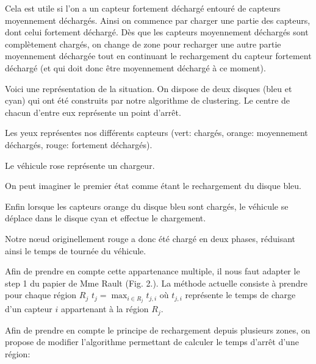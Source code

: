 \documentclass[final]{polytech/polytech}
\begin{document}
			Cela est utile si l'on a un capteur fortement déchargé entouré de capteurs moyennement déchargés.
			Ainsi on commence par charger une partie des capteurs, dont celui fortement déchargé.
			Dès que les capteurs moyennement déchargés sont complètement chargés, on change de zone pour recharger une autre partie moyennement déchargée tout en continuant le rechargement du capteur fortement déchargé (et qui doit donc être moyennement déchargé à ce moment).
			
			Voici une représentation de la situation.
			On dispose de deux disques (bleu et cyan) qui ont été construits par notre algorithme de clustering.
			Le centre de chacun d'entre eux représente un point d'arrêt.
			
			Les yeux représentes nos différents capteurs (vert: chargés, orange: moyennement déchargés, rouge: fortement déchargés).
			
			Le véhicule rose représente un chargeur.
			
			On peut imaginer le premier état comme étant le rechargement du disque bleu.
			
			
			Enfin lorsque les capteurs orange du disque bleu sont chargés, le véhicule se déplace dans le disque cyan et effectue le chargement.
			
			
			Notre n\oe ud originellement rouge a donc été chargé en deux phases, réduisant ainsi le temps de tournée du véhicule.
			
			Afin de prendre en compte cette appartenance multiple, il nous faut adapter le step 1 du papier de Mme Rault \cite{Rault:chargers} (Fig. 2.).
			La méthode actuelle consiste à prendre pour chaque région $R_j$ $t_j=\max_{i\in R_j}t_{j,i}$ où $t_{j,i}$ représente le temps de charge d'un capteur $i$ appartenant à la région $R_j$.
			
			Afin de prendre en compte le principe de rechargement depuis plusieurs zones, on propose de modifier l'algorithme permettant de calculer le temps d'arrêt d'une région:
			
\end{document}
